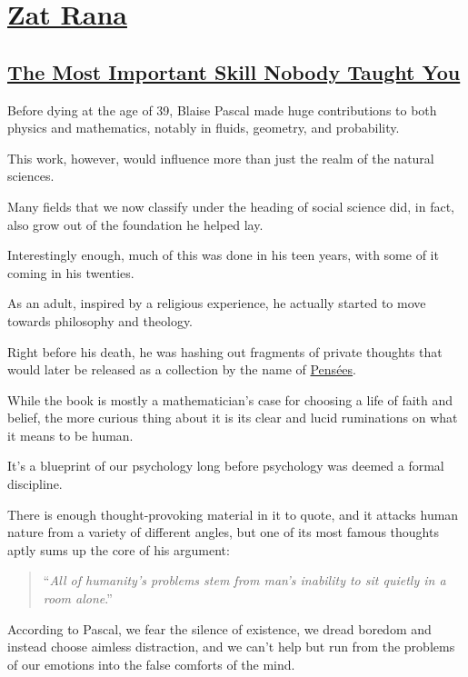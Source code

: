 \documentclass{book}
\numberwithin{equation}{section}
\begin{document}

\part{\href{https://medium.com/@ztrana}{Zat Rana}}

\chapter{\href{https://medium.com/personal-growth/the-most-important-skill-nobody-taught-you-9b162377ab77}{The Most Important Skill Nobody Taught You}}

Before dying at the age of 39, Blaise Pascal made huge contributions to both physics and mathematics, notably in fluids, geometry, and probability.

%
This work, however, would influence more than just the realm of the natural sciences.

Many fields that we now classify under the heading of social science did, in fact, also grow out of the foundation he helped lay.

%
Interestingly enough, much of this was done in his teen years, with some of it coming in his twenties.

As an adult, inspired by a religious experience, he actually started to move towards philosophy and theology.

%
Right before his death, he was hashing out fragments of private thoughts that would later be released as a collection by the name of \href{https://designluck.com/recommends/pascals-pensees/}{Pensées}.

%
While the book is mostly a mathematician's case for choosing a life of faith and belief, the more curious thing about it is its clear and lucid ruminations on what it means to be human.

It's a blueprint of our psychology long before psychology was deemed a formal discipline.

%
There is enough thought-provoking material in it to quote, and it attacks human nature from a variety of different angles, but one of its most famous thoughts aptly sums up the core of his argument:

\begin{quotation}
    ``\textit{All of humanity's problems stem from man's inability to sit quietly in a room alone}.''
\end{quotation}
According to Pascal, we fear the silence of existence, we dread boredom and instead choose aimless distraction, and we can't help but run from the problems of our emotions into the false comforts of the mind.
\end{document}
